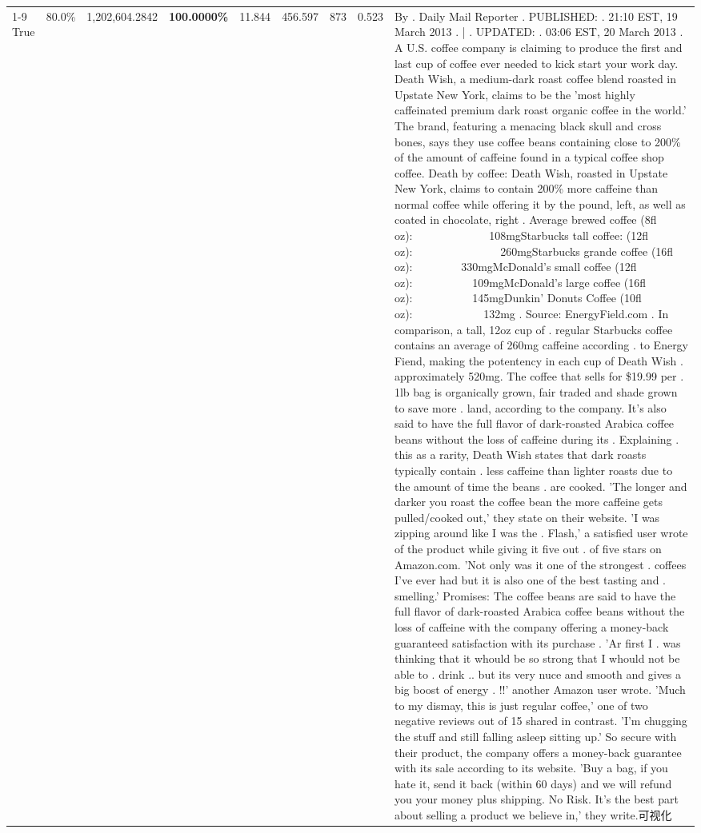 \begin{table}[H]
{\begin{tabular}{lllrlllll}
\cline{1-9}
True & 80.0\% & 1,202,604.2842 & \bfseries \color{red} 100.0000\% & 11.844 & 456.597 & 873 & 0.523 & By . Daily Mail Reporter . PUBLISHED: . 21:10 EST, 19 March 2013 . | . UPDATED: . 03:06 EST, 20 March 2013 . A U.S. coffee company is claiming to produce the first and last cup of coffee ever needed to kick start your work day. Death Wish, a medium-dark roast coffee blend roasted in Upstate New York, claims to be the 'most highly caffeinated premium dark roast organic coffee in the world.' The brand, featuring a menacing black skull and cross bones, says they use coffee beans containing close to 200\% of the amount of caffeine found in a typical coffee shop coffee. Death by coffee: Death Wish, roasted in Upstate New York, claims to contain 200\% more caffeine than normal coffee while offering it by the pound, left, as well as coated in chocolate, right . Average brewed coffee (8fl oz):              108mgStarbucks tall coffee: (12fl oz):                260mgStarbucks grande coffee (16fl oz):         330mgMcDonald's small coffee (12fl oz):           109mgMcDonald's large coffee (16fl oz):           145mgDunkin' Donuts Coffee (10fl oz):             132mg . Source: EnergyField.com . In comparison, a tall, 12oz cup of . regular Starbucks coffee contains an average of 260mg caffeine according . to Energy Fiend, making the potentency in each cup of Death Wish . approximately 520mg. The coffee that sells for \$19.99 per . 1lb bag is organically grown, fair traded and shade grown to save more . land, according to the company. It's also said to have the full flavor of dark-roasted Arabica coffee beans without the loss of caffeine during its . Explaining . this as a rarity, Death Wish states that dark roasts typically contain . less caffeine than lighter roasts due to the amount of time the beans . are cooked. 'The longer and darker you roast the coffee bean the more caffeine gets pulled/cooked out,' they state on their website. 'I was zipping around like I was the . Flash,' a satisfied user wrote of the product while giving it five out . of five stars on Amazon.com. 'Not only was it one of the strongest . coffees I've ever had but it is also one of the best tasting and . smelling.’ Promises: The coffee beans are said to have the full flavor of dark-roasted Arabica coffee beans without the loss of caffeine with the company offering a money-back guaranteed satisfaction with its purchase . 'Ar first I . was thinking that it whould be so strong that I whould not be able to . drink .. but its very nuce and smooth and gives a big boost of energy . !!' another Amazon user wrote. 'Much to my dismay, this is just regular coffee,' one of two negative reviews out of 15 shared in contrast. 'I'm chugging the stuff and still falling asleep sitting up.' So secure with their product, the company offers a money-back guarantee with its sale according to its website. 'Buy a bag, if you hate it, send it back (within 60 days) and we will refund you your money plus shipping. No Risk. It’s the best part about selling a product we believe in,' they write.可视化 \\

\end{tabular}}
\end{table}
